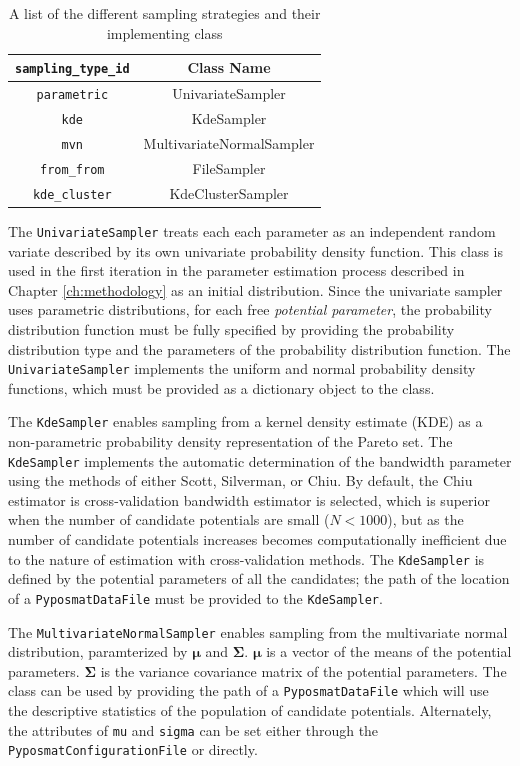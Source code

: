 \begin{table}[ht]
	\centering
	\caption{A list of the different sampling strategies and their implementing class}
	\label{tbl:pyposmat_samplers}
	\begin{tabular}{cc}
		\hline
		\verb|sampling_type_id| & Class Name \\
		\hline
		\verb|parametric| & UnivariateSampler \\
		\verb|kde| & KdeSampler \\
		\verb|mvn| & MultivariateNormalSampler \\
		\verb|from_from| & FileSampler \\
		\verb|kde_cluster| & KdeClusterSampler \\
		\hline
	\end{tabular}
\end{table}

The \verb|UnivariateSampler| treats each each parameter as an independent random variate described by its own univariate probability density function.  This class is used in the first iteration in the parameter estimation process described in Chapter \ref{ch:methodology} as an initial distribution.  Since the univariate sampler uses parametric distributions, for each free \emph{potential parameter}, the probability distribution function must be fully specified by providing the probability distribution type and the parameters of the probability distribution function.  The \verb|UnivariateSampler| implements the uniform and normal probability density functions, which must be provided as a dictionary object to the class.

The \verb|KdeSampler| enables sampling from a kernel density estimate (KDE) as a non-parametric probability density representation of the Pareto set.  The \verb|KdeSampler| implements the automatic determination of the bandwidth parameter using the methods of either Scott\cite{scott1992_kde_bw}, Silverman\cite{silverman1986_kde}, or Chiu\cite{chiu1991_kde_bw}.  By default, the Chiu estimator is cross-validation bandwidth estimator is selected, which is superior when the number of candidate potentials are small ($N<1000$), but as the number of candidate potentials increases becomes computationally inefficient due to the nature of estimation with cross-validation methods.  The \verb|KdeSampler| is defined by the potential parameters of all the candidates; the path of the location of a \verb|PyposmatDataFile| must be provided to the \verb|KdeSampler|.

The \verb|MultivariateNormalSampler| enables sampling from the multivariate normal distribution, paramterized by $\bm{\mu}$ and $\bm{\Sigma}$. $\bm{\mu}$ is a vector of the means of the potential parameters. $\bm{\Sigma}$ is the variance covariance matrix of the potential parameters.  The class can be used by providing the path of a \verb|PyposmatDataFile| which will use the descriptive statistics of the population of candidate potentials.
Alternately, the attributes of \verb|mu| and \verb|sigma| can be set either through the \verb|PyposmatConfigurationFile| or directly.

